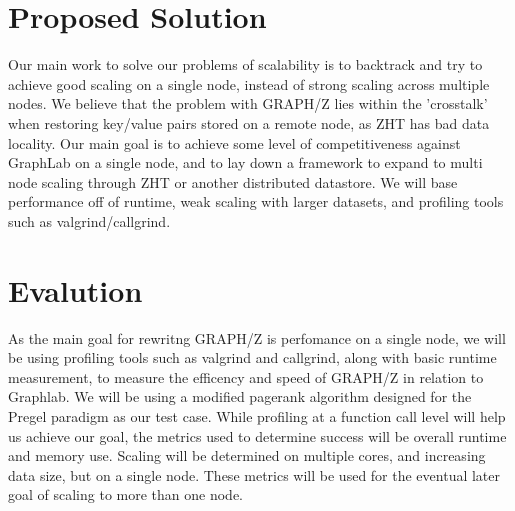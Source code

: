 \documentclass[10pt]{article}
\begin{document}
\begin{multicols}{2}
  \section{Proposed Solution}
  Our main work to solve our problems of scalability is to backtrack and try to achieve good scaling on a single node, instead of strong scaling across multiple nodes. We believe that the problem with GRAPH/Z lies within the 'crosstalk' when restoring key/value pairs stored on a remote node, as ZHT has bad data locality. Our main goal is to achieve some level of competitiveness against GraphLab on a single node, and to lay down a framework to expand to multi node scaling through ZHT or another distributed datastore. We will base performance off of runtime, weak scaling with larger datasets, and profiling tools such as valgrind/callgrind.
  \section{Evalution}
  As the main goal for rewritng GRAPH/Z is perfomance on a single node, we will be using profiling tools such as valgrind and callgrind, along with basic runtime measurement, to measure the efficency and speed of GRAPH/Z in relation to Graphlab. We will be using a modified pagerank algorithm designed for the Pregel paradigm as our test case. While profiling at a function call level will help us achieve our goal, the metrics used to determine success will be overall runtime and memory use. Scaling will be determined on multiple cores, and increasing data size, but on a single node.  These metrics will be used for the eventual later goal of scaling to more than one node.
\end{multicols}
\end{document}
